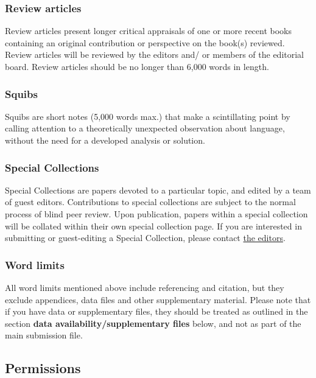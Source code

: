 \documentclass[charis,linguex]{glossa}
\begin{document}
\subsubsection{Review articles}

Review articles present longer critical appraisals of one or more recent books containing an original contribution or perspective on the book(s) reviewed. Review articles will be reviewed by the editors and/ or members of the editorial board. Review articles should be no longer than 6,000 words in length.

\subsubsection{Squibs}

Squibs are short notes (5,000 words max.) that make a scintillating point by calling attention to a theoretically unexpected observation about language, without the need for a developed analysis or solution.

\subsubsection{Special Collections}

Special Collections are papers devoted to a particular topic, and edited by a team of guest editors. Contributions to special collections are subject to the normal process of blind peer review. Upon publication, papers within a special collection will be collated within their own special collection page. If you are interested in submitting or guest-editing a Special Collection, please contact \href{https://www.glossa-journal.org/about/editorialteam/}{the editors}.

\subsubsection{Word limits}

All word limits mentioned above include referencing and citation, but they exclude appendices, data files and other supplementary material. Please note that if you have data or supplementary files, they should be treated as outlined in the section \textbf{data availability/supplementary files} below, and not as part of the main submission file.


\subsection{Permissions}
\end{document}
